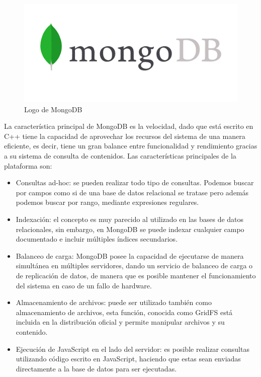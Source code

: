 \begin{figure}[H]
    \centering
    \includegraphics[scale=0.2]{include/figuras/mongo.png}
    \caption{Logo de MongoDB}
    \label{fig:mongo}
\end{figure}

La característica principal de MongoDB es la velocidad, dado que está escrito en C++ tiene la capacidad de aprovechar los recursos del sistema de una manera eficiente, es decir, tiene un gran balance entre funcionalidad y rendimiento gracias a su sistema de consulta de contenidos. Las características principales de la plataforma son:

\begin{itemize}
    \item Consultas ad-hoc: se pueden realizar todo tipo de consultas. Podemos buscar por campos como si de una base de datos relacional se tratase pero además podemos buscar por rango, mediante expresiones regulares.
    \item Indexación: el concepto es muy parecido al utilizado en las bases de datos relacionales, sin embargo, en MongoDB se puede indexar cualquier campo documentado e incluir múltiples índices secundarios.
    \item Balanceo de carga: MongoDB posee la capacidad de ejecutarse de manera simultánea en múltiples servidores, dando un servicio de balanceo de carga o de replicación de datos, de manera que es posible mantener el funcionamiento del sistema en caso de un fallo de hardware.
    \item Almacenamiento de archivos: puede ser utilizado también como almacenamiento de archivos, esta función, conocida como GridFS está incluida en la distribución oficial y permite manipular archivos y su contenido.
    \item Ejecución de JavaScript en el lado del servidor: es posible realizar consultas utilizando código escrito en JavaScript, haciendo que estas sean enviadas directamente a la base de datos para ser ejecutadas.
\end{itemize}

